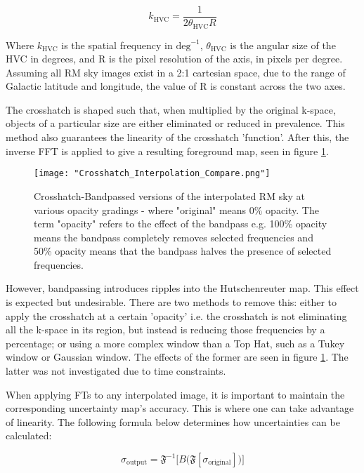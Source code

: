 \begin{equation}
        k_{\mathrm{HVC}} = \frac{1}{2 \theta_{\mathrm{HVC}} R}
    \label{eq:freq_to_angle}
\end{equation}


Where $k_{\mathrm{HVC}}$ is the spatial frequency in $\mathrm{deg}^{-1}$, $\theta_{\mathrm{HVC}}$ is the angular size of the HVC in degrees, and R is the pixel resolution of the axis, in pixels per degree. Assuming all RM sky images exist in a 2:1 cartesian space, due to the range of Galactic latitude and longitude, the value of R is constant across the two axes.


The crosshatch is shaped such that, when multiplied by the original k-space, objects of a particular size are either eliminated or reduced in prevalence. This method also guarantees the linearity of the crosshatch 'function'. After this, the inverse FFT is applied to give a resulting foreground map, seen in figure \ref{fig:ripples}.

\begin{figure}
    \texttt{[image: "Crosshatch\_Interpolation\_Compare.png"]}
    \centering
    \caption{Crosshatch-Bandpassed versions of the interpolated RM sky at various opacity gradings - where "original" means 0\% opacity. The term "opacity" refers to the effect of the bandpass e.g. 100\% opacity means the bandpass completely removes selected frequencies and 50\% opacity means that the bandpass halves the presence of selected frequencies.}
    \label{fig:ripples}
\end{figure}


However, bandpassing introduces ripples into the Hutschenreuter map. This effect is expected but undesirable. There are two methods to remove this: either to apply the crosshatch at a certain 'opacity' i.e. the crosshatch is not eliminating all the k-space in its region, but instead is reducing those frequencies by a percentage; or using a more complex window than a Top Hat, such as a Tukey window or Gaussian window. The effects of the former are seen in figure \ref{fig:ripples}. The latter was not investigated due to time constraints.


When applying FTs to any interpolated image, it is important to maintain the corresponding uncertainty map's accuracy. This is where one can take advantage of linearity. The following formula below determines how uncertainties can be calculated:


\begin{equation}
    \sigma_{\mathrm{output}} = \mathbf{\mathfrak{F}}^{-1} \biggl[ B \bigl( \mathbf{\mathfrak{F}} \left[ \sigma_{\mathrm{original}} \right] \bigr) \biggr]
    \label{eq:ft_unc}
\end{equation}


